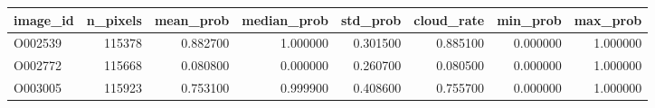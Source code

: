 \begin{tabular}{lrrrrrrr}
\toprule
image_id & n_pixels & mean_prob & median_prob & std_prob & cloud_rate & min_prob & max_prob \\
\midrule
O002539 & 115378 & 0.882700 & 1.000000 & 0.301500 & 0.885100 & 0.000000 & 1.000000 \\
O002772 & 115668 & 0.080800 & 0.000000 & 0.260700 & 0.080500 & 0.000000 & 1.000000 \\
O003005 & 115923 & 0.753100 & 0.999900 & 0.408600 & 0.755700 & 0.000000 & 1.000000 \\
\bottomrule
\end{tabular}
